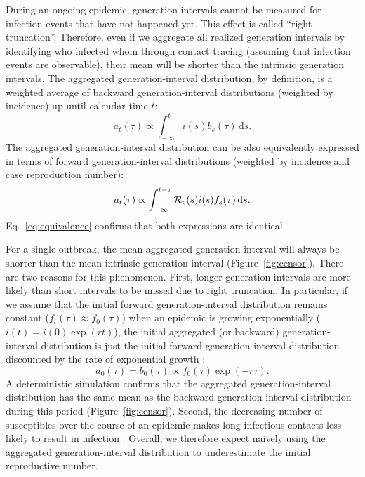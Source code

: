 \documentclass[12pt]{article}
\newcommand{\eref}[1]{Eq.~\ref{eq:#1}}
\begin{document}
During an ongoing epidemic, generation intervals cannot be measured for infection events that have not happened yet.
This effect is called ``right-truncation''.
Therefore, even if we aggregate all realized generation intervals by identifying who infected whom through contact tracing (assuming that infection events are observable), their mean will be shorter than the intrinsic generation intervals.
The aggregated generation-interval distribution, by definition, is a weighted average of backward generation-interval distributions (weighted by incidence) up until calendar time $t$:
\begin{equation}
a_t(\tau) \propto \int_{-\infty}^t i(s) b_s(\tau) \,\mathrm{d}s.
\end{equation}
The aggregated generation-interval distribution can be also equivalently expressed in terms of forward generation-interval distributions (weighted by incidence and case reproduction number):
\begin{equation}
a_t(\tau) \propto \int_{-\infty}^{t-\tau} \mathcal R_{\rm c}(s) i(s) f_s(\tau) \,\mathrm{d}s.
\end{equation}
\eref{equivalence} confirms that both expressions are identical.

For a single outbreak, the mean aggregated generation interval will always be shorter than the mean intrinsic generation interval (Figure~\ref{fig:censor}).
There are two reasons for this phenomenon.
First, longer generation intervals are more likely than short intervals to be missed due to right truncation.
In particular, if we assume that the initial forward generation-interval distribution remains constant ($f_t(\tau) \approx f_0(\tau)$) when an epidemic is growing exponentially ($i(t) = i(0) \exp(rt)$), 
the initial aggregated (or backward) generation-interval distribution is just the initial forward generation-interval distribution discounted by the rate of exponential growth \citep{britton2019estimation}:
\begin{equation}
a_0(\tau) = b_0(\tau) \propto f_0(\tau) \exp(-r\tau).
\label{eq:exp}
\end{equation}
A deterministic simulation confirms that the aggregated generation-interval distribution has the same mean as the backward generation-interval distribution during this period (Figure~\ref{fig:censor}).
Second, the decreasing number of susceptibles over the course of an epidemic makes long infectious contacts less likely to result in infection \citep{champredon2015intrinsic}.
Overall, we therefore expect naively using the aggregated generation-interval distribution to underestimate the initial reproductive number.
\end{document}
